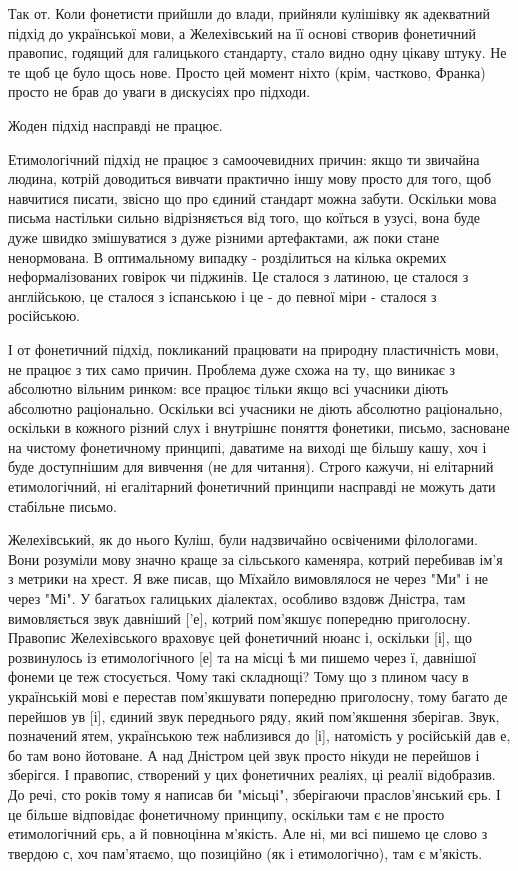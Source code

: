 Так от. Коли фонетисти прийшли до влади, прийняли кулішівку як адекватний
підхід до української мови, а Желехівський на її основі створив фонетичний
правопис, годящий для галицького стандарту, стало видно одну цікаву штуку. Не
те щоб це було щось нове. Просто цей момент ніхто (крім, частково, Франка)
просто не брав до уваги в дискусіях про підходи. 

Жоден підхід насправді не працює. 

Етимологічний підхід не працює з самоочевидних причин: якщо ти звичайна людина,
котрій доводиться вивчати практично іншу мову просто для того, щоб навчитися
писати, звісно що про єдиний стандарт можна забути. Оскільки мова письма
настільки сильно відрізняється від того, що коїться в узусі, вона буде дуже
швидко змішуватися з дуже різними артефактами, аж поки стане ненормована. В
оптимальному випадку - розділиться на кілька окремих неформалізованих говірок
чи піджинів. Це сталося з латиною, це сталося з англійською, це сталося з
іспанською і це - до певної міри - сталося з російською. 

І от фонетичний підхід, покликаний працювати на природну пластичність мови, не
працює з тих само причин. Проблема дуже схожа на ту, що виникає з абсолютно
вільним ринком: все працює тільки якщо всі учасники діють абсолютно
раціонально. Оскільки всі учасники не діють абсолютно раціонально, оскільки в
кожного різний слух і внутрішнє поняття фонетики, письмо, засноване на чистому
фонетичному принципі, даватиме на виході ще більшу кашу, хоч і буде доступнішим
для вивчення (не для читання). Строго кажучи, ні елітарний етимологічний, ні
егалітарний фонетичний принципи насправді не можуть дати стабільне письмо.

Желехівський, як до нього Куліш, були надзвичайно освіченими філологами. Вони
розуміли мову значно краще за сільського каменяра, котрий перебивав ім'я з
метрики на хрест. Я вже писав, що Мїхайло вимовлялося не через "Ми" і не через
"Мі". У багатьох галицьких діалектах, особливо вздовж Дністра, там вимовляється
звук давніший ['е], котрий пом'якшує попередню приголосну. Правопис
Желехівського враховує цей фонетичний нюанс і, оскільки [і], що розвинулось із
етимологічного [е] та на місці ѣ ми пишемо через ї, давнішої фонеми це теж
стосується. Чому такі складнощі? Тому що з плином часу в українській мові е
перестав пом'якшувати попередню приголосну, тому багато де перейшов ув [і],
єдиний звук переднього ряду, який пом'якшення зберігав. Звук, позначений ятем,
українською теж наблизився до [і], натомість у російській дав е, бо там воно
йотоване. А над Дністром цей звук просто нікуди не перейшов і зберігся. І
правопис, створений у цих фонетичних реаліях, ці реалії відобразив. До речі,
сто років тому я написав би "місьці", зберігаючи праслов'янський єрь. І це
більше відповідає фонетичному принципу, оскільки там є не просто етимологічний
єрь, а й повноцінна м'якість. Але ні, ми всі пишемо це слово з твердою с, хоч
пам'ятаємо, що позиційно (як і етимологічно), там є м'якість.

